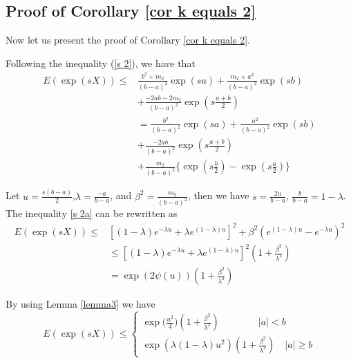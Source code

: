 \documentclass[journal]{IEEEtran}
\begin{document}
\subsection{Proof of Corollary \ref{cor k equals 2}}

Now let us present the proof of Corollary \ref{cor k equals 2}.


\begin{IEEEproof}

Following the inequality (\ref{s 2}), we have that
\begin{equation}\label{s 2a}
\begin{split}
  E(\exp(s X))\leq {}&\frac{b^2+m_2}{(b-a)^2}\exp(sa)+\frac{m_2+a^2}{(b-a)^2}\exp(sb){}\\
  &+\frac{-2ab-2m_2}{(b-a)^2}\exp(s\frac{a+b}{2})\\
 & =\frac{b^2}{(b-a)^2}\exp(sa)+\frac{a^2}{(b-a)^2}\exp(sb)\\
  &+\frac{-2ab}{(b-a)^2}\exp(s\frac{a+b}{2})\\
 & +\frac{m_2}{(b-a)^2} \{ \exp(s\frac{b}{2})-\exp(s\frac{a}{2})\}
  \end{split}
\end{equation}

Let $u=\frac{s(b-a)}{2}$,$\lambda=\frac{-a}{b-a}$, and $\beta^2=\frac{m_2}{(b-a)^2}$, then we have
$s=\frac{2u}{b-a}$, $\frac{b}{b-a}=1-\lambda$. The inequality \ref{s 2a} can be rewritten as
\begin{equation}
  \begin{split}
  E(\exp(sX))\leq{}& [(1-\lambda)e^{-\lambda u}+\lambda e^{(1-\lambda)u}]^2 +\beta^2 (e^{(1-\lambda)u}-e^{-\lambda u})^2{} \\
  & \leq [(1-\lambda)e^{-\lambda u}+\lambda e^{(1-\lambda)u}]^2 (1+\frac{\beta^2}{\lambda^2})\\
  &=\exp(2\psi(u))(1+\frac{\beta^2}{\lambda^2})
  \end{split}
\end{equation}

By using Lemma \ref{lemma3}
 we have
 \begin{equation}
    E(\exp(sX))\leq \begin{cases} \exp\big( \frac{u^2}{4}\big)(1+\frac{\beta^2}{\lambda^2}) \quad \quad \quad \quad  |a|<b \\
      \exp(\lambda(1-\lambda)u^2)(1+\frac{\beta^2}{\lambda^2}) \quad |a|\geq b
      \end{cases}
     \end{equation}


\end{IEEEproof}
\end{document}

